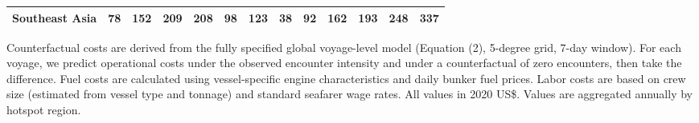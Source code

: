 \begin{table}
\begin{adjustbox}{width = .9\textwidth}
\begin{threeparttable}
\begin{tabular}[t]{lrrrrrrrrrrrr}
\hspace{1em}Southeast Asia & 78 & 152 & 209 & 208 & 98 & 123 & 38 & 92 & 162 & 193 & 248 & 337\\
\bottomrule
\end{tabular}
\begin{tablenotes}
\item \scriptsize Counterfactual costs are derived from the fully specified global voyage-level model (Equation (2), 5-degree grid, 7-day window). For each voyage, we predict operational costs under the observed encounter intensity and under a counterfactual of zero encounters, then take the difference. Fuel costs are calculated using vessel-specific engine characteristics and daily bunker fuel prices. Labor costs are based on crew size (estimated from vessel type and tonnage) and standard seafarer wage rates. All values in 2020 US\$. Values are aggregated annually by hotspot region.
\end{tablenotes}
\end{threeparttable}
\end{adjustbox}
\end{table}
